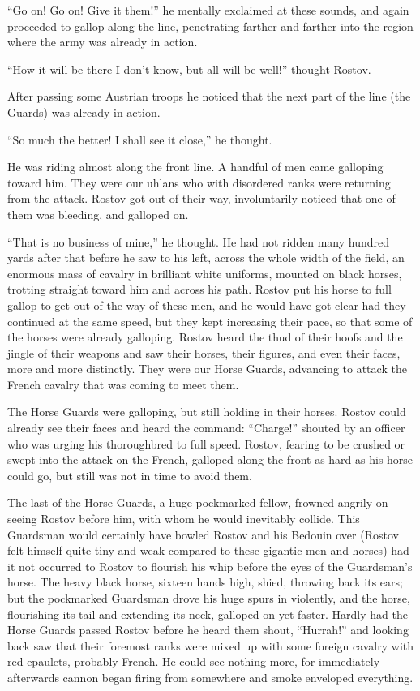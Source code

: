 ``Go on! Go on! Give it them!'' he mentally exclaimed at these
sounds, and again proceeded to gallop along the line, penetrating
farther and farther into the region where the army was already in
action.

``How it will be there I don't know, but all will be well!''
thought Rostov.

After passing some Austrian troops he noticed that the next part
of the line (the Guards) was already in action.

``So much the better! I shall see it close,'' he thought.

He was riding almost along the front line. A handful of men came
galloping toward him. They were our uhlans who with disordered
ranks were returning from the attack. Rostov got out of their
way, involuntarily noticed that one of them was bleeding, and
galloped on.

``That is no business of mine,'' he thought. He had not ridden
many hundred yards after that before he saw to his left, across
the whole width of the field, an enormous mass of cavalry in
brilliant white uniforms, mounted on black horses, trotting
straight toward him and across his path. Rostov put his horse to
full gallop to get out of the way of these men, and he would have
got clear had they continued at the same speed, but they kept
increasing their pace, so that some of the horses were already
galloping. Rostov heard the thud of their hoofs and the jingle of
their weapons and saw their horses, their figures, and even their
faces, more and more distinctly. They were our Horse Guards,
advancing to attack the French cavalry that was coming to meet
them.

The Horse Guards were galloping, but still holding in their
horses.  Rostov could already see their faces and heard the
command: ``Charge!''  shouted by an officer who was urging his
thoroughbred to full speed.  Rostov, fearing to be crushed or
swept into the attack on the French, galloped along the front as
hard as his horse could go, but still was not in time to avoid
them.

The last of the Horse Guards, a huge pockmarked fellow, frowned
angrily on seeing Rostov before him, with whom he would
inevitably collide. This Guardsman would certainly have bowled
Rostov and his Bedouin over (Rostov felt himself quite tiny and
weak compared to these gigantic men and horses) had it not
occurred to Rostov to flourish his whip before the eyes of the
Guardsman's horse. The heavy black horse, sixteen hands high,
shied, throwing back its ears; but the pockmarked Guardsman drove
his huge spurs in violently, and the horse, flourishing its tail
and extending its neck, galloped on yet faster. Hardly had the
Horse Guards passed Rostov before he heard them shout,
``Hurrah!'' and looking back saw that their foremost ranks were
mixed up with some foreign cavalry with red epaulets, probably
French. He could see nothing more, for immediately afterwards
cannon began firing from somewhere and smoke enveloped
everything.

